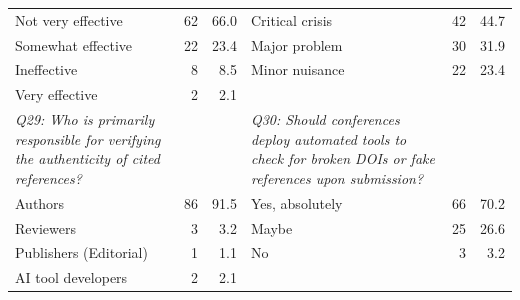 \begin{table}[htbp]
\begin{tabular}{p{6cm}rr|p{6cm}rr}
\rowcolor{tableRowLight}
Not very effective & 62 & 66.0 & Critical crisis & 42 & 44.7 \\
Somewhat effective & 22 & 23.4 & Major problem & 30 & 31.9 \\
\rowcolor{tableRowLight}
Ineffective & 8 & 8.5 & Minor nuisance & 22 & 23.4 \\
Very effective & 2 & 2.1 &  &  &  \\
\midrule
\textit{Q29: Who is primarily responsible for verifying the authenticity of cited references?} & & & \textit{Q30: Should conferences deploy automated tools to check for broken DOIs or fake references upon submission?} & & \\
\rowcolor{tableRowLight}
Authors & 86 & 91.5 & Yes, absolutely & 66 & 70.2 \\
Reviewers & 3 & 3.2 & Maybe & 25 & 26.6 \\
\rowcolor{tableRowLight}
Publishers (Editorial) & 1 & 1.1 & No & 3 & 3.2 \\
AI tool developers & 2 & 2.1 &  &  &  \\
\bottomrule
\end{tabular}
\end{table}

